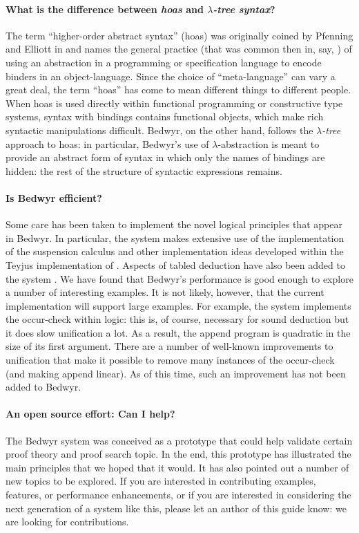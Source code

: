 \paragraph{What is the difference between \emph{hoas} and
  \emph{$\lambda$-tree syntax}?}
The term ``higher-order abstract syntax'' (hoas) was originally coined
by Pfenning and Elliott in \cite{pfenning88pldi} and names the general
practice (that was common then in, say, \lp{} \cite{miller87slp}) of
using an abstraction in a programming or specification language to
encode binders in an object-language.  Since the choice of
``meta-language'' can vary a great deal, the term ``hoas'' has come to
mean different things to different people.  When hoas is used directly
within functional programming or constructive type systems, syntax with
bindings contains functional objects, which make rich syntactic
manipulations difficult.  Bedwyr, on the other hand, follows the
\emph{$\lambda$-tree} approach \cite{miller00cl} to hoas: in particular,
Bedwyr's use of $\lambda$-abstraction is meant to provide an abstract
form of syntax in which only the names of bindings are hidden: the rest
of the structure of syntactic expressions remains.

\paragraph{Is Bedwyr efficient?}
Some care has been taken to implement the novel logical principles that
appear in Bedwyr.  In particular, the system makes extensive use of the
implementation of the suspension calculus \cite{nadathur99jflp} and
other implementation ideas developed within the Teyjus
\cite{nadathur99cade} implementation of \lp{} \cite{nadathur88iclp}.
Aspects of tabled deduction have also been added to the system
\cite{ramakrishna97cav,pientka05cade}.  We have found that Bedwyr's
performance is good enough to explore a number of interesting examples.
It is not likely, however, that the current implementation will support
large examples.  For example, the system implements the occur-check
within logic: this is, of course, necessary for sound deduction but it
does slow unification a lot.  As a result, the append program is
quadratic in the size of its first argument.  There are a number of
well-known improvements to unification that make it possible to remove
many instances of the occur-check (and making append linear).  As of
this time, such an improvement has not been added to Bedwyr.

\paragraph{An open source effort: Can I help?}
The Bedwyr system was conceived as a prototype that could help validate
certain proof theory and proof search topic.  In the end, this prototype
has illustrated the main principles that we hoped that it would.  It has
also pointed out a number of new topics to be explored.  If you are
interested in contributing examples, features, or performance
enhancements, or if you are interested in considering the next
generation of a system like this, please let an author of this guide
know: we are looking for contributions.


